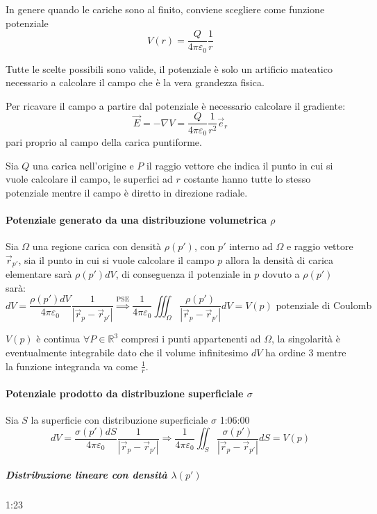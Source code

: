 In genere quando le cariche sono al finito, conviene scegliere come funzione potenziale
$$
V(r) = \frac{Q}{4 \pi \varepsilon_0}\frac{1}{r}
$$

Tutte le scelte possibili sono valide, il potenziale è solo un artificio mateatico
necessario a calcolare il campo che è la vera grandezza fisica.

Per ricavare il campo a partire dal potenziale è necessario calcolare il gradiente:
$$
\vec{E} = -\nabla V = \frac{Q}{4\pi\varepsilon_0}\frac{1}{r^2}\vec{e}_r
$$
pari proprio al campo della carica puntiforme.

Sia $Q$ una carica nell'origine e $P$ il raggio vettore che indica il punto in cui si vuole
calcolare il campo, le superfici ad $r$ costante hanno tutte lo stesso potenziale mentre
il campo è diretto in direzione radiale.

\paragraph{Potenziale generato da una distribuzione volumetrica $\rho$}
Sia $\Omega$ una regione carica con densità $\rho(p')$, con $p'$ interno ad $\Omega$ e raggio
vettore $\vec{r}_{p'}$, sia il punto in cui si vuole calcolare il campo $p$
allora la densità di carica elementare sarà $\rho(p')dV$, di conseguenza il potenziale in $p$
dovuto a $\rho(p')$ sarà:
$$
dV = \frac{\rho(p')dV}{4\pi\varepsilon_0}\frac{1}{|\vec{r}_p - \vec{r}_{p'}|} 
\stackrel{\text{PSE}}{\Rightarrow} \frac{1}{4\pi\varepsilon_0} \iiint_\Omega \frac{\rho(p')}{|\vec{r}_p - \vec{r}_{p'}|} dV = V(p) \text{ potenziale di Coulomb}
$$

$V(p)$ è continua $\forall P \in \mathbb{R}^3$ compresi i punti appartenenti ad $\Omega$, la 
singolarità è eventualmente integrabile dato che il volume infinitesimo $dV$ ha ordine 3 mentre la 
funzione integranda va come $\frac{1}{r}$.

\paragraph{Potenziale prodotto da distribuzione superficiale $\sigma$}
Sia $S$ la superficie con distribuzione superficiale $\sigma$ 1:06:00
$$
dV = \frac{\sigma(p')dS}{4\pi\varepsilon_0} \frac{1}{|\vec{r}_p - \vec{r}_{p'}|} \Rightarrow
\frac{1}{4\pi\varepsilon_0} \iint_S \frac{\sigma(p')}{|\vec{r}_p - \vec{r}_{p'}|} dS = V(p)
$$

\subparagraph{Distribuzione lineare con densità $\lambda(p')$}
1:23

